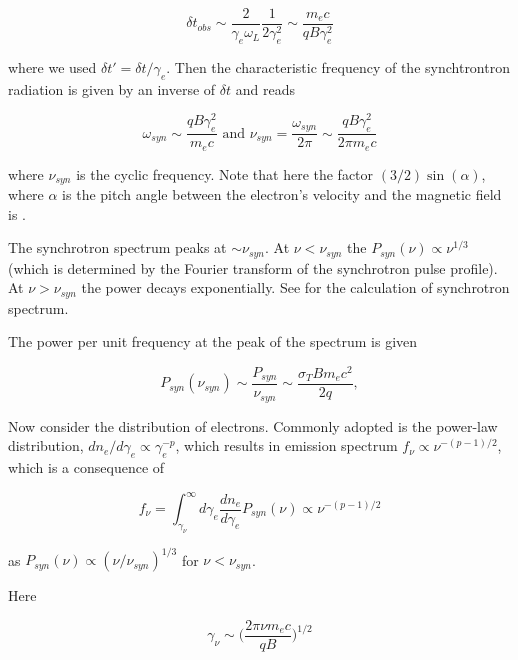 \begin{equation}
\delta t_{obs} \sim \frac{2}{\gamma_e \omega_L}\frac{1}{2\gamma_e^2}\sim \frac{m_e c}{q B \gamma_e^2}
\end{equation}

where we used $\delta t' = \delta t / \gamma_e$. 
Then the characteristic frequency of the synchtrontron radiation is given by an inverse of $\delta t$ and reads 

\begin{equation}
\omega_{syn} \sim \frac{q B \gamma_e^2}{m_e c} \text{ and } \nu_{syn} = \frac{\omega_{syn}}{2\pi} \sim \frac{q B \gamma_e^2}{2\pi m_e c}
\end{equation}

where $\nu_{syn}$ is the cyclic frequency.
Note that here the factor $(3/2)\sin(\alpha)$, where $\alpha$ is the pitch angle between the electron's velocity and the magnetic field is .

The synchrotron spectrum peaks at $\sim \nu_{syn}$. At $\nu < \nu_{syn}$ the $P_{syn}(\nu)\propto\nu^{1/3}$ (which is determined by the Fourier transform of the synchrotron pulse profile). At $\nu > \nu_{syn}$ the power decays exponentially. See \citet{RybickiLightman:1985} for the calculation of synchrotron spectrum.

The power per unit frequency at the peak of the spectrum is given 

\begin{equation}
P_{syn}(\nu_{syn}) \sim \frac{P_{syn}}{\nu_{syn}} \sim \frac{\sigma_T B m_e c^2}{2 q},
\end{equation}

Now consider the distribution of electrons.
Commonly adopted is the power-law distribution, $dn_e/d\gamma_e \propto \gamma_e^{-p}$, which results in emission spectrum $f_{\nu}\propto\nu^{-(p-1)/2}$,
which is a consequence of 

\begin{equation}
f_{\nu} = \int_{\gamma_{\nu}}^{\infty} d\gamma_e \frac{dn_e}{d\gamma_e}P_{syn}(\nu) \propto \nu^{-(p-1)/2}
\end{equation}

as $P_{syn}(\nu) \propto (\nu/\nu_{syn})^{1/3}$ for $\nu < \nu_{syn}$.

Here

\begin{equation}
\gamma_{\nu} \sim \Bigg(\frac{2\pi\nu m_e c}{qB}\Bigg)^{1/2}
\end{equation}

